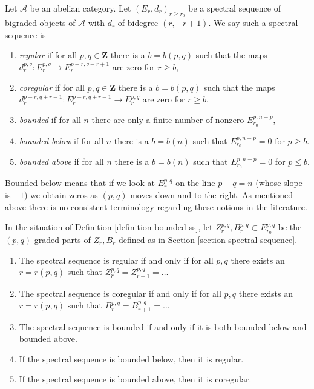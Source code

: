 \begin{definition}
\label{definition-bounded-ss}
Let $\mathcal{A}$ be an abelian category. Let $(E_r, d_r)_{r \geq r_0}$
be a spectral sequence of bigraded objects of
$\mathcal{A}$ with $d_r$ of bidegree $(r, -r + 1)$.
We say such a spectral sequence is
\begin{enumerate}
\item {\it regular} if for all $p, q \in \mathbf{Z}$ there is
a $b = b(p, q)$ such that the maps
$d_r^{p, q} : E_r^{p, q} \to E_r^{p + r, q - r + 1}$ are zero for $r \geq b$,
\item {\it coregular} if for all $p, q \in \mathbf{Z}$ there is a
$b = b(p, q)$ such that the maps
$d_r^{p - r, q + r - 1} : E_r^{p - r, q + r - 1} \to E_r^{p, q}$
are zero for $r \geq b$,
\item {\it bounded} if for all $n$
there are only a finite number of nonzero $E_{r_0}^{p, n - p}$,
\item {\it bounded below} if for all $n$ there is a $b = b(n)$ such that
$E_{r_0}^{p, n - p} = 0$ for $p \geq b$.
\item {\it bounded above} if for all $n$ there is a $b = b(n)$ such that
$E_{r_0}^{p, n - p} = 0$ for $p \leq b$.
\end{enumerate}
\end{definition}

\noindent
Bounded below means that if we look at $E_r^{p, q}$ on the line
$p + q = n$ (whose slope is $-1$) we obtain zeros as $(p, q)$
moves down and to the right.
As mentioned above there is no consistent terminology regarding
these notions in the literature.

\begin{lemma}
\label{lemma-relate-boundedness}
In the situation of Definition \ref{definition-bounded-ss},
let $Z_r^{p, q}, B_r^{p, q} \subset E_{r_0}^{p, q}$ be the
$(p, q)$-graded parts of $Z_r, B_r$ defined as in
Section \ref{section-spectral-sequence}.
\begin{enumerate}
\item The spectral sequence is regular if and only if for all $p, q$
there exists an $r = r(p, q)$ such that
$Z_r^{p, q} = Z_{r + 1}^{p, q} = \ldots$
\item The spectral sequence is coregular if and only if for all $p, q$
there exists an $r = r(p, q)$ such that
$B_r^{p, q} = B_{r + 1}^{p, q} = \ldots$
\item The spectral sequence is bounded if and only if it is both
bounded below and bounded above.
\item If the spectral sequence is bounded below, then it is regular.
\item If the spectral sequence is bounded above, then it is coregular.
\end{enumerate}
\end{lemma}

